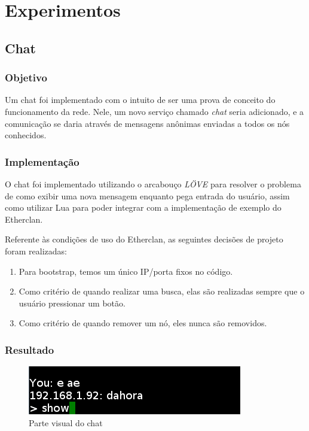 \chapter{Experimentos}
\label{sec:experimentos}

\section{Chat}
\label{sec:experimentos:chat}

  \subsection{Objetivo}
    Um chat foi implementado com o intuito de ser uma prova de conceito do funcionamento da rede.
    Nele, um novo serviço chamado \textit{chat} seria adicionado, e a comunicação se daria
    através de mensagens anônimas enviadas a todos os nós conhecidos.
    
  \subsection{Implementação}
    O chat foi implementado utilizando o arcabouço \textit{LÖVE} para resolver o problema
    de como exibir uma nova mensagem enquanto pega entrada do usuário, assim como utilizar
    Lua para poder integrar com a implementação de exemplo do Etherclan.
    
    Referente às condições de uso do Etherclan, as seguintes decisões de projeto foram realizadas:
    \begin{enumerate}
      \item Para bootstrap, temos um único IP/porta fixos no código.
      \item Como critério de quando realizar uma busca, elas são realizadas sempre que o
        usuário pressionar um botão.
      \item Como critério de quando remover um nó, eles nunca são removidos.
    \end{enumerate}
    
  \subsection{Resultado}
    \begin{figure}[h]
      \centering
      \includegraphics{../slides/chat.png}
      \caption{Parte visual do chat}
    \end{figure}
    
